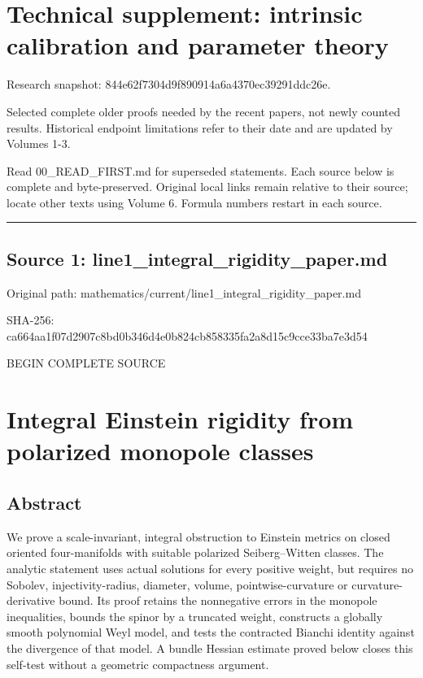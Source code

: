 \documentclass[
  10pt,
]{article}
\author{}
\date{}
\begin{document}
\hypertarget{technical-supplement-intrinsic-calibration-and-parameter-theory}{%
\section{Technical supplement: intrinsic calibration and parameter
theory}\label{technical-supplement-intrinsic-calibration-and-parameter-theory}}

Research snapshot: 844e62f7304d9f890914a6a4370ec39291ddc26e.

Selected complete older proofs needed by the recent papers, not newly
counted results. Historical endpoint limitations refer to their date and
are updated by Volumes 1-3.

Read 00\_READ\_FIRST.md for superseded statements. Each source below is
complete and byte-preserved. Original local links remain relative to
their source; locate other texts using Volume 6. Formula numbers restart
in each source.

\begin{center}\rule{0.5\linewidth}{0.5pt}\end{center}

\hypertarget{source-1-line1_integral_rigidity_paper.md}{%
\subsection{Source 1:
line1\_integral\_rigidity\_paper.md}\label{source-1-line1_integral_rigidity_paper.md}}

Original path: mathematics/current/line1\_integral\_rigidity\_paper.md

SHA-256:
ca664aa1f07d2907c8bd0b346d4e0b824cb858335fa2a8d15c9cce33ba7e3d54

BEGIN COMPLETE SOURCE

\hypertarget{integral-einstein-rigidity-from-polarized-monopole-classes}{%
\section{Integral Einstein rigidity from polarized monopole
classes}\label{integral-einstein-rigidity-from-polarized-monopole-classes}}

\hypertarget{abstract}{%
\subsection{Abstract}\label{abstract}}

We prove a scale-invariant, integral obstruction to Einstein metrics on
closed oriented four-manifolds with suitable polarized Seiberg--Witten
classes. The analytic statement uses actual solutions for every positive
weight, but requires no Sobolev, injectivity-radius, diameter, volume,
pointwise-curvature or curvature-derivative bound. Its proof retains the
nonnegative errors in the monopole inequalities, bounds the spinor by a
truncated weight, constructs a globally smooth polynomial Weyl model,
and tests the contracted Bianchi identity against the divergence of that
model. A bundle Hessian estimate proved below closes this self-test
without a geometric compactness argument.
\end{document}

